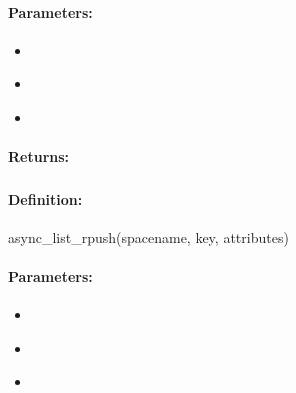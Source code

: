 \paragraph{Parameters:}
\begin{itemize}[noitemsep]
\item {}\\

\item {}\\

\item {}\\

\end{itemize}

\paragraph{Returns:}


\pagebreak
\subsubsection{}
\label{api:ruby:async_list_rpush}


\paragraph{Definition:}
\begin{rubycode}
async_list_rpush(spacename, key, attributes)
\end{rubycode}

\paragraph{Parameters:}
\begin{itemize}[noitemsep]
\item {}\\

\item {}\\

\item {}\\

\end{itemize}

